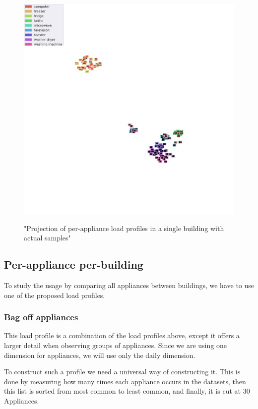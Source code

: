 \begin{figure}[H]
	\centering
	\caption{"Projection of per-appliance load profiles in a single building with actual samples"}
	\includegraphics[width=.9\textwidth]{Figures/TSNE/TSNE_results/refit/img_scatter_refit8.png}
	\label{fig:tsne_papb_img_scatter_ent_refit8}
\end{figure}

\subsection{Per-appliance per-building}
To study the usage by comparing all appliances between buildings,
we have to use one of the proposed load profiles.

\subsubsection{Bag off appliances}
This load profile is a combination of the load profiles above,
except it offers a larger detail when observing groups of appliances.
Since we are using one dimension for appliances, we will use only the daily dimension.

To construct such a profile we need a universal way of constructing it.
This is done by measuring how many times each appliance occurs in the datasets,
then this list is sorted from most common to least common, and finally, it is cut at 30 Appliances.

